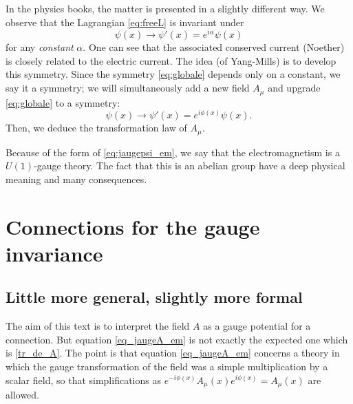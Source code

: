\begin{remark}
In the physics books, the matter is presented in a slightly different way. We observe that the Lagrangian \eqref{eq:freeL} is invariant under
\begin{equation}\label{eq:globale}
\psi(x)\rightarrow\psi'(x)=e^{i\alpha}\psi(x)
\end{equation}
%
for any \emph{constant} $\alpha$. One can see that the associated conserved current (Noether) is closely related to the electric current. The idea (of Yang-Mills) is to develop this symmetry. Since the symmetry \eqref{eq:globale} depends only on a constant, we say it a  symmetry; we will simultaneously add a new field $A_{\mu}$ and upgrade \eqref{eq:globale} to a  symmetry:
 \begin{equation}\label{eq:locate}
\psi(x)\rightarrow\psi'(x)=e^{i\phi(x)}\psi(x).
\end{equation}
Then, we deduce the transformation law of $A_{\mu}$.
 \end{remark}

Because of the form of \eqref{eq:jaugepsi_em}, we say that the electromagnetism is a $U(1)$-gauge theory. The fact that this is an abelian group have a deep physical meaning and many consequences.

\section{Connections for the gauge invariance}

\subsection{Little more general, slightly more formal}

The aim of this text is to interpret the field $A$ as a gauge potential for a connection. But equation \eqref{eq_jaugeA_em} is not exactly the expected one which is \eqref{tr_de_A}. The point is that equation \eqref{eq_jaugeA_em} concerns a theory in which the gauge transformation of the field was a simple multiplication by a scalar field, so that simplifications as $e^{-i\phi(x)}A_{\mu}(x)e^{i\phi(x)}=A_{\mu}(x)$ are allowed.

